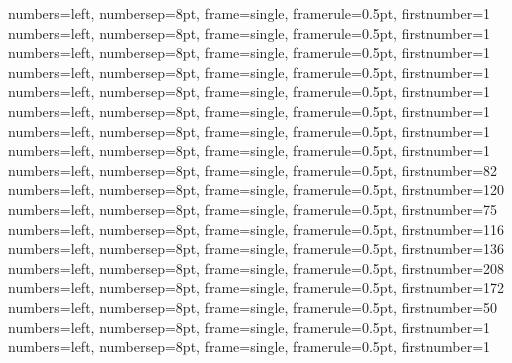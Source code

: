 {numbers=left, numbersep=8pt, frame=single, framerule=0.5pt, firstnumber=1}
{numbers=left, numbersep=8pt, frame=single, framerule=0.5pt, firstnumber=1}
{numbers=left, numbersep=8pt, frame=single, framerule=0.5pt, firstnumber=1}
{numbers=left, numbersep=8pt, frame=single, framerule=0.5pt, firstnumber=1}
{numbers=left, numbersep=8pt, frame=single, framerule=0.5pt, firstnumber=1}
{numbers=left, numbersep=8pt, frame=single, framerule=0.5pt, firstnumber=1}
{numbers=left, numbersep=8pt, frame=single, framerule=0.5pt, firstnumber=1}
{numbers=left, numbersep=8pt, frame=single, framerule=0.5pt, firstnumber=1}
{numbers=left, numbersep=8pt, frame=single, framerule=0.5pt, firstnumber=82}
{numbers=left, numbersep=8pt, frame=single, framerule=0.5pt, firstnumber=120}
{numbers=left, numbersep=8pt, frame=single, framerule=0.5pt, firstnumber=75}
{numbers=left, numbersep=8pt, frame=single, framerule=0.5pt, firstnumber=116}
{numbers=left, numbersep=8pt, frame=single, framerule=0.5pt, firstnumber=136}
{numbers=left, numbersep=8pt, frame=single, framerule=0.5pt, firstnumber=208}
{numbers=left, numbersep=8pt, frame=single, framerule=0.5pt, firstnumber=172}
{numbers=left, numbersep=8pt, frame=single, framerule=0.5pt, firstnumber=50}
{numbers=left, numbersep=8pt, frame=single, framerule=0.5pt, firstnumber=1}
{numbers=left, numbersep=8pt, frame=single, framerule=0.5pt, firstnumber=1}
